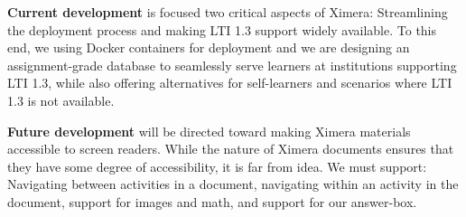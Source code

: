 \documentclass[twocolumn]{article}
\begin{document}
\begin{xframe}
    {\sffamily\bfseries Current development} is focused two critical
    aspects of Ximera: Streamlining the deployment
    process and making LTI 1.3 support widely available.
    To this end, we using Docker containers for deployment  and we are
    designing an assignment-grade
    database to seamlessly serve  learners at institutions supporting LTI 1.3,
    while also
    offering alternatives for self-learners and scenarios where
    LTI 1.3 is not available.
    \begin{center}
    \end{center}
\end{xframe}
\begin{xframe}
    {\sffamily\bfseries Future development} will be directed toward making
    Ximera materials accessible to screen readers. While the nature of Ximera
    documents ensures that they have some degree of accessibility, it is far from
    idea.  We must support: Navigating
    between activities in a document, navigating within an activity in the
    document, support for images and math, and support for our answer-box.
\end{xframe}

\restoregeometry
\end{document}
